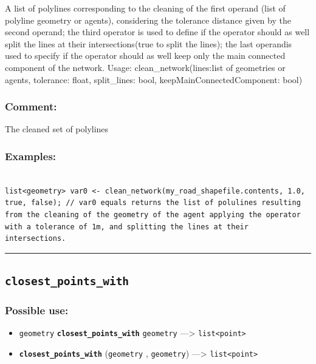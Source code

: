 \documentclass[]{book}
\providecommand{\tightlist}{%
  \setlength{\itemsep}{0pt}\setlength{\parskip}{0pt}}
\theoremstyle{definition}
\theoremstyle{definition}
\theoremstyle{definition}
\theoremstyle{remark}
\begin{document}
A list of polylines corresponding to the cleaning of the first operand
(list of polyline geometry or agents), considering the tolerance
distance given by the second operand; the third operator is used to
define if the operator should as well split the lines at their
intersections(true to split the lines); the last operandis used to
specify if the operator should as well keep only the main connected
component of the network. Usage: clean\_network(lines:list of geometries
or agents, tolerance: float, split\_lines: bool,
keepMainConnectedComponent: bool)

\subsubsection{Comment:}\label{comment-19}

The cleaned set of polylines

\subsubsection{Examples:}\label{examples-66}

\begin{verbatim}
 
list<geometry> var0 <- clean_network(my_road_shapefile.contents, 1.0, true, false); // var0 equals returns the list of polulines resulting from the cleaning of the geometry of the agent applying the operator with a tolerance of 1m, and splitting the lines at their intersections.
\end{verbatim}

\begin{center}\rule{0.5\linewidth}{\linethickness}\end{center}

\subsection{\texorpdfstring{\texttt{closest\_points\_with}}{closest\_points\_with}}\label{closest_points_with}

\subsubsection{Possible use:}\label{possible-use-88}

\begin{itemize}
\tightlist
\item
  \texttt{geometry} \textbf{\texttt{closest\_points\_with}}
  \texttt{geometry} ---\textgreater{}
  \texttt{list\textless{}point\textgreater{}}
\item
  \textbf{\texttt{closest\_points\_with}} (\texttt{geometry} ,
  \texttt{geometry}) ---\textgreater{}
  \texttt{list\textless{}point\textgreater{}}
\end{itemize}
\end{document}
